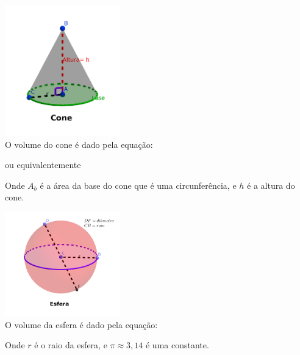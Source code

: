 \begin{multicols}{2}
 \includegraphics[width=5cm]{./cap_geometria/figs/cone} \\

 O volume do cone é dado pela equação:
 
 ou equivalentemente
 

 Onde $A_b$ é a área da base do cone que é uma circunferência, e $h$ é a altura do cone.
\end{multicols}

\begin{multicols}{2}
 \includegraphics[width=5cm]{./cap_geometria/figs/esfera} \\

 O volume da esfera é dado pela equação:
 
 
 Onde $r$ é o raio da esfera, e $\pi \approx 3,14$ é uma constante.
\end{multicols}
